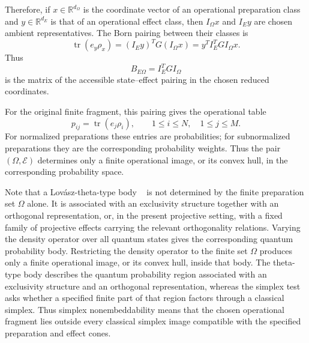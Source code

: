 \documentclass[aps,pra,twocolumn,superscriptaddress,nofootinbib]{revtex4-2}
\newcommand{\E}{\mathcal{E}}
\newcommand{\OmegaSet}{\Omega}
\newcommand{\tr}{\operatorname{tr}}
\newcommand{\reals}{\mathbb{R}}
\begin{document}
Therefore, if $x\in\reals^{d_\Omega}$ is the coordinate vector of an
operational preparation class and $y\in\reals^{d_E}$ is that of an operational
effect class, then $I_\Omega x$ and $I_E y$ are chosen ambient
representatives.  The Born pairing between their classes is
\begin{equation}
        \tr(e_y\rho_x)
        =
        (I_E y)^T G (I_\Omega x)
        =
        y^T I_E^T G I_\Omega x.
        \label{eq:born-pairing-coordinate}
\end{equation}
Thus
\begin{equation}
        B_{E\Omega}=I_E^T G I_\Omega
        \label{eq:born-pairing-matrix}
\end{equation}
is the matrix of the accessible state--effect pairing in the chosen reduced
coordinates.

For the original finite fragment, this pairing gives the operational table
\begin{equation}
        p_{ij}=\tr(e_j\rho_i),
        \qquad
        1\le i\le N,\quad 1\le j\le M .
\end{equation}
For normalized preparations these entries are probabilities; for
subnormalized preparations they are the corresponding probability weights.
Thus the pair $(\OmegaSet,\E)$ determines only a finite operational image, or
its convex hull, in the corresponding probability space.

Note that a Lov\'asz-theta-type body
~\cite{GroetschelLovaszSchrijver1986,Cabello-2014-gtatqc} is not determined
by the finite preparation set $\OmegaSet$ alone.  It is associated with an
exclusivity structure together with an orthogonal representation, or, in the
present projective setting, with a fixed family of projective effects carrying
the relevant orthogonality relations.  Varying the density operator over all
quantum states gives the corresponding quantum probability body.  Restricting
the density operator to the finite set $\OmegaSet$ produces only a finite
operational image, or its convex hull, inside that body. The theta-type body describes the quantum probability region associated with
an exclusivity structure and an orthogonal representation, whereas the simplex
test asks whether a specified finite part of that region factors through a
classical simplex.  Thus simplex nonembeddability means that the chosen
operational fragment lies outside every classical simplex image compatible
with the specified preparation and effect cones.
\end{document}

